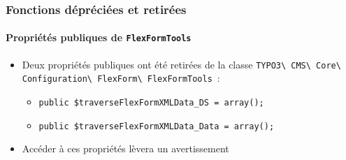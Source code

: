 \begin{frame}[fragile]
	\frametitle{Fonctions dépréciées et retirées}
	\framesubtitle{Propriétés publiques de \texttt{FlexFormTools}}

	\begin{itemize}
		\item Deux propriétés publiques ont été retirées de la classe
			\texttt{TYPO3\textbackslash
				CMS\textbackslash
				Core\textbackslash
				Configuration\textbackslash
				FlexForm\textbackslash
				FlexFormTools}~:

		\begin{itemize}
			\item \texttt{public \$traverseFlexFormXMLData\_DS = array();}
			\item \texttt{public \$traverseFlexFormXMLData\_Data = array();}
		\end{itemize}

		\item Accéder à ces propriétés lèvera un avertissement

	\end{itemize}

\end{frame}



